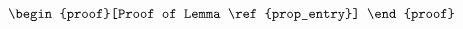 \documentclass[aos,preprint]{imsart}
\begin{document}
\begin{equation}
\begin{proof}[Proof of Lemma \ref{prop_entry}]
%



\end{proof}
\end{equation}
\end{document}
